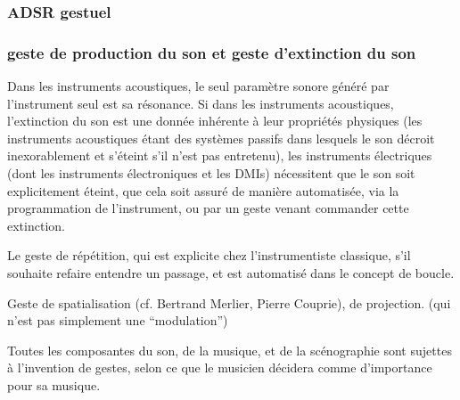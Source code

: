 \subsubsection{ADSR gestuel}


\subsubsection{geste de production du son et geste d'extinction du son}

Dans les instruments acoustiques, le seul paramètre sonore généré par l'instrument seul est sa résonance.
Si dans les instruments acoustiques, l'extinction du son est une donnée inhérente à leur propriétés physiques (les instruments acoustiques étant des systèmes passifs dans lesquels le son décroit inexorablement et s'éteint s'il n'est pas entretenu), les instruments électriques (dont les instruments électroniques et les \glspl{DMI}) nécessitent que le son soit explicitement éteint, que cela soit assuré de manière automatisée, via la programmation de l'instrument, ou par un geste venant commander cette extinction.

Le geste de répétition, qui est explicite chez l'instrumentiste classique, s'il souhaite refaire entendre un passage, et est automatisé dans le concept de boucle.

Geste de spatialisation (cf. Bertrand Merlier, Pierre Couprie), de projection. (qui n'est pas simplement une ``modulation'')

Toutes les composantes du son, de la musique, et de la scénographie sont sujettes à l'invention de gestes, selon ce que le musicien décidera comme d'importance pour sa musique.



